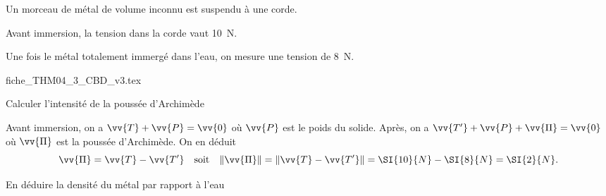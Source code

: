 Un morceau de métal de volume inconnu est suspendu à une corde. 

Avant immersion, la tension dans la corde vaut \SI{10}{N}. 

Une fois le métal totalement immergé dans l'eau, on mesure une tension de \SI{8}{N}.


                                \initialisationPartieDroite %
\def\ratioScaleImage{0.35}
\begin{center}
{fiche_THM04_3_CBD_v3.tex}
\end{center}
                               \finalisationDuPartageDePage %

\debutEntrainement


\begin{enonce}
Calculer l'intensité de la poussée d'Archimède
\end{enonce}


\begin{corrige}
Avant immersion, on a $\vv{T}+\vv{P}=\vv{0}$ où $\vv{P}$ est le poids du solide. Après, on a $\vv{T'}+\vv{P}+\vv{\Pi}=\vv{0}$ où $\vv{\Pi}$ est la poussée d'Archimède. On en déduit 
\[
\vv{\Pi}=\vv{T}-\vv{T'}\quad\text{soit}\quad
\|\vv{\Pi}\|=\|\vv{T}-\vv{T'}\|=\SI{10}{N}-\SI{8}{N}=\SI{2}{N}.
\]
\end{corrige}

\begin{enonce}
En déduire la densité du métal par rapport à l’eau
\end{enonce}


